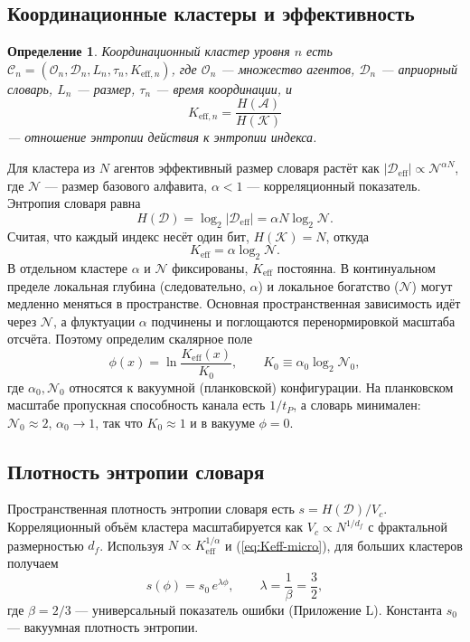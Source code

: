\documentclass[12pt,a4paper]{article}
\newtheorem{definition}[theorem]{Определение}
\newcommand{\Dir}{\mathcal{D}}
\begin{document}
	\subsection{Координационные кластеры и эффективность}
	\begin{definition}
		Координационный кластер уровня \(n\) есть \(\mathcal{C}_n = (\mathcal{O}_n, \Dir_n, L_n, \tau_n, K_{\mathrm{eff},n})\), где \(\mathcal{O}_n\) — множество агентов, \(\Dir_n\) — априорный словарь, \(L_n\) — размер, \(\tau_n\) — время координации, и
		\[
		K_{\mathrm{eff},n} = \frac{H(\mathcal{A})}{H(\mathcal{K})}
		\]
		— отношение энтропии действия к энтропии индекса.
	\end{definition}
	
	Для кластера из \(N\) агентов эффективный размер словаря растёт как \(|\Dir_{\mathrm{eff}}| \propto \mathcal{N}^{\alpha N}\), где \(\mathcal{N}\) — размер базового алфавита, \(\alpha<1\) — корреляционный показатель. Энтропия словаря равна
	\[
	H(\Dir) = \log_2 |\Dir_{\mathrm{eff}}| = \alpha N \log_2 \mathcal{N}.
	\]
	Считая, что каждый индекс несёт один бит, \(H(\mathcal{K}) = N\), откуда
	\begin{equation}
		K_{\mathrm{eff}} = \alpha \log_2 \mathcal{N}. \label{eq:Keff-micro}
	\end{equation}
	В отдельном кластере \(\alpha\) и \(\mathcal{N}\) фиксированы, \(K_{\mathrm{eff}}\) постоянна. В континуальном пределе локальная глубина (следовательно, \(\alpha\)) и локальное богатство (\(\mathcal{N}\)) могут медленно меняться в пространстве. Основная пространственная зависимость идёт через \(\mathcal{N}\), а флуктуации \(\alpha\) подчинены и поглощаются перенормировкой масштаба отсчёта. Поэтому определим скалярное поле
	\begin{equation}
		\phi(x) = \ln \frac{K_{\mathrm{eff}}(x)}{K_0}, \qquad K_0 \equiv \alpha_0 \log_2 \mathcal{N}_0,
		\label{eq:phi-def}
	\end{equation}
	где \(\alpha_0,\mathcal{N}_0\) относятся к вакуумной (планковской) конфигурации. На планковском масштабе пропускная способность канала есть \(1/t_P\), а словарь минимален: \(\mathcal{N}_0 \approx 2\), \(\alpha_0 \rightarrow 1\), так что \(K_0 \approx 1\) и в вакууме \(\phi=0\).
	
	\subsection{Плотность энтропии словаря}
	Пространственная плотность энтропии словаря есть \(s = H(\Dir)/V_c\). Корреляционный объём кластера масштабируется как \(V_c \propto N^{1/d_f}\) с фрактальной размерностью \(d_f\). Используя \(N \propto K_{\mathrm{eff}}^{1/\alpha}\) и (\ref{eq:Keff-micro}), для больших кластеров получаем
	\begin{equation}
		s(\phi) = s_0\, e^{\lambda\phi}, \qquad \lambda = \frac{1}{\beta} = \frac{3}{2},
		\label{eq:s-phi}
	\end{equation}
	где \(\beta = 2/3\) — универсальный показатель ошибки (Приложение L). Константа \(s_0\) — вакуумная плотность энтропии.
	
\end{document}
